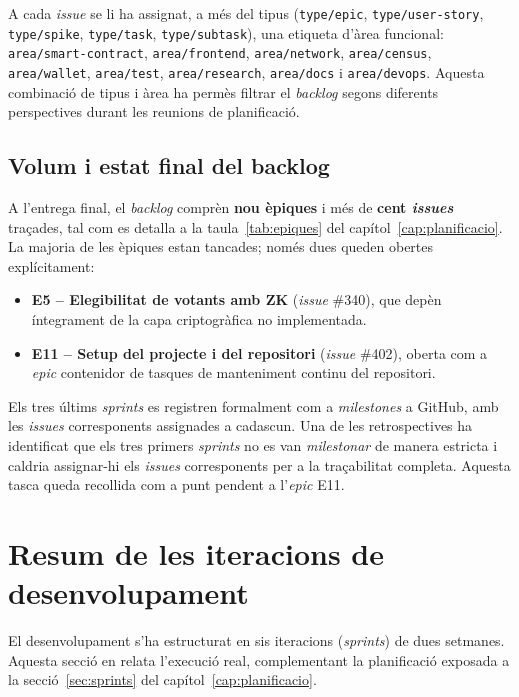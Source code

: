 A cada \emph{issue} se li ha assignat, a més del tipus
(\texttt{type/epic}, \texttt{type/user-story}, \texttt{type/spike},
\texttt{type/task}, \texttt{type/subtask}), una etiqueta d'àrea
funcional: \texttt{area/smart-contract}, \texttt{area/frontend},
\texttt{area/network}, \texttt{area/census}, \texttt{area/wallet},
\texttt{area/test}, \texttt{area/research}, \texttt{area/docs} i
\texttt{area/devops}. Aquesta combinació de tipus i àrea ha permès
filtrar el \emph{backlog} segons diferents perspectives durant les
reunions de planificació.

\subsection{Volum i estat final del backlog}

A l'entrega final, el \emph{backlog} comprèn \textbf{nou èpiques} i més
de \textbf{cent \emph{issues}} traçades, tal com es detalla a la
taula~\ref{tab:epiques} del capítol~\ref{cap:planificacio}. La majoria
de les èpiques estan tancades; només dues queden obertes
explícitament:

\begin{itemize}
    \item \textbf{E5 -- Elegibilitat de votants amb \ac{ZK}}
    (\emph{issue} \#340), que depèn íntegrament de la capa
    criptogràfica no implementada.
    \item \textbf{E11 -- Setup del projecte i del repositori}
    (\emph{issue} \#402), oberta com a \emph{epic} contenidor de
    tasques de manteniment continu del repositori.
\end{itemize}

Els tres últims \emph{sprints} es registren formalment com a
\emph{milestones} a GitHub, amb les \emph{issues} corresponents
assignades a cadascun. Una de les retrospectives ha identificat que
els tres primers \emph{sprints} no es van \emph{milestonar} de
manera estricta i caldria assignar-hi els \emph{issues} corresponents
per a la traçabilitat completa. Aquesta tasca queda recollida com a
punt pendent a l'\emph{epic} E11.

\section{Resum de les iteracions de desenvolupament}
\label{sec:iteracions}

El desenvolupament s'ha estructurat en sis iteracions
(\emph{sprints}) de dues setmanes. Aquesta secció en relata
l'execució real, complementant la planificació exposada a la
secció~\ref{sec:sprints} del capítol~\ref{cap:planificacio}.

